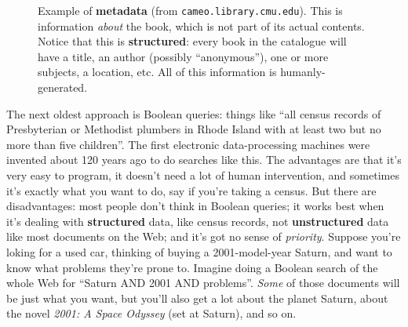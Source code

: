 \documentclass{article}
\begin{document}
\begin{figure}
  \caption{Example of {\bf metadata} (from \texttt{cameo.library.cmu.edu}).
    This is information {\em about} the book, which is not part of its actual
    contents.  Notice that this is {\bf structured}: every book in the
    catalogue will have a title, an author (possibly ``anonymous''), one or
    more subjects, a location, etc.  All of this information is
    humanly-generated.}
  \label{fig:metadata}
\end{figure}


The next oldest approach is Boolean queries: things like ``all census records
of Presbyterian or Methodist plumbers in Rhode Island with at least two but no
more than five children''.  The first electronic data-processing machines were
invented about 120 years ago to do searches like this.  The advantages are that
it's very easy to program, it doesn't need a lot of human intervention, and
sometimes it's exactly what you want to do, say if you're taking a census.  But
there are disadvantages: most people don't think in Boolean queries; it works
best when it's dealing with {\bf structured} data, like census records, not
{\bf unstructured} data like most documents on the Web; and it's got no sense
of {\em priority}.  Suppose you're loking for a used car, thinking of buying a
2001-model-year Saturn, and want to know what problems they're prone to.
Imagine doing a Boolean search of the whole Web for ``Saturn AND 2001 AND
problems''.  {\em Some} of those documents will be just what you want, but
you'll also get a lot about the planet Saturn, about the novel {\em 2001: A
  Space Odyssey} (set at Saturn), and so on.
\end{document}
